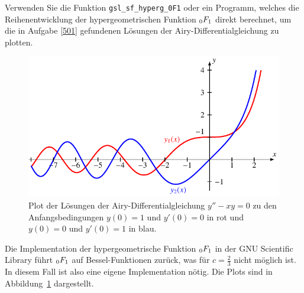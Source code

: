 Verwenden Sie die Funktion \verb+gsl_sf_hyperg_0F1+ oder ein Programm,
welches die Reihenentwicklung der hypergeometrischen Funktion
$\mathstrut_0F_1$ direkt berechnet, um die
in Aufgabe \ref{501} gefundenen Lösungen der Airy-Differentialgleichung
zu plotten.
%

\begin{figure}
\centering
\includegraphics{chapters/050-differential/uebungsaufgaben/airy.pdf}
\caption{Plot der Lösungen der Airy-Differentialgleichung $y''-xy=0$
zu den Anfangsbedingungen $y(0)=1$ und $y'(0)=0$ in {\color{red}rot}
und $y(0)=0$ und $y'(0)=1$ in {\color{blue}blau}.
\label{buch:differentialgleichunge:uebung:503:plot}}
\end{figure}
\begin{loesung}
Die Implementation der hypergeometrische Funktion $\mathstrut_0F_1$ in der
GNU Scientific Library führt $\mathstrut_0F_1$ auf Bessel-Funktionen
%
%
zurück, was für $c=\frac23$ nicht möglich ist. 
In diesem Fall ist also eine eigene Implementation nötig.
Die Plots sind in Abbildung~\ref{buch:differentialgleichunge:uebung:503:plot}
dargestellt.
\end{loesung}
